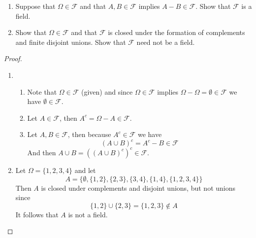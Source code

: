 \documentclass[12pt]{article}
\newcommand{\F}{\mathcal{F}}
\newcommand{\Om}{\Omega}
\newcommand{\es}{\emptyset}
\newcommand{\un}{\cup}
\newenvironment{exercise}[2][Exercise]{\begin{trivlist}
\item[\hskip \labelsep {\bfseries #1}\hskip \labelsep {\bfseries #2.}]}{\end{trivlist}}
\begin{document}
\begin{exercise}{2.3}
    \begin{enumerate}
        \item Suppose that $\Omega \in \F$ and that $A, B \in \F$ implies $A - B \in \F$. Show that $\F$ is a field.
        \item Show that $\Om \in \F$ and that $\F$ is closed under the formation of complements and finite disjoint unions. Show that $\F$ need not be a field.
    \end{enumerate}
\end{exercise}
\begin{proof}
    \begin{enumerate}
        \item \begin{enumerate}
            \item Note that $\Om \in \F$ (given) and since $\Om \in \F$ implies $\Om - \Om = \es \in \F$ we have $\es \in \F$.
            \item Let $A \in \F$, then $A^{c} = \Om - A \in \F$.
            \item Let $A, B \in \F$, then because $A^{c} \in \F$ we have
            \[ (A \un B)^{c} = A^{c} - B \in \F \]
            And then $A \un B = ((A \un B)^{c})^{c} \in \F$.
        \end{enumerate} 
        \item Let $\Om = \{ 1, 2, 3, 4 \}$ and let 
        \[ A = \{ \es, \{ 1, 2 \}, \{ 2, 3 \}, \{ 3, 4 \}, \{ 1, 4 \}, \{ 1, 2, 3, 4 \} \} \]
        Then $A$ is closed under complements and disjoint unions, but not unions since \[ \{ 1, 2 \} \un \{ 2, 3 \} = \{ 1, 2, 3 \} \notin A \]
        It follows that $A$ is not a field.
    \end{enumerate}
\end{proof}
\end{document}
